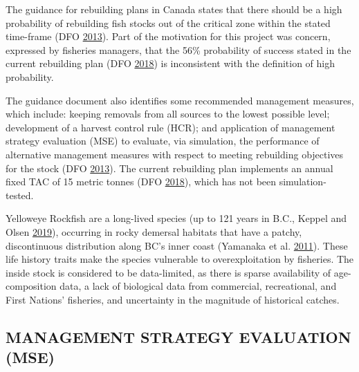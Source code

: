 \documentclass[11pt]{book}
\begin{document}
The guidance for rebuilding plans in Canada states that there should be a high probability of rebuilding fish stocks out of the critical zone within the stated time-frame (DFO \protect\hyperlink{ref-dfo2013}{2013}). Part of the motivation for this project was concern, expressed by fisheries managers, that the 56\% probability of success stated in the current rebuilding plan (DFO \protect\hyperlink{ref-ifmp2018}{2018}) is inconsistent with the definition of high probability.

The guidance document also identifies some recommended management measures, which include: keeping removals from all sources to the lowest possible level; development of a harvest control rule (HCR); and application of management strategy evaluation (MSE) to evaluate, via simulation, the performance of alternative management measures with respect to meeting rebuilding objectives for the stock (DFO \protect\hyperlink{ref-dfo2013}{2013}). The current rebuilding plan implements an annual fixed TAC of 15 metric tonnes (DFO \protect\hyperlink{ref-ifmp2018}{2018}), which has not been simulation-tested.

Yelloweye Rockfish are a long-lived species (up to 121 years in B.C., Keppel and Olsen \protect\hyperlink{ref-keppel2019}{2019}), occurring in rocky demersal habitats that have a patchy, discontinuous distribution along BC's inner coast (Yamanaka et al. \protect\hyperlink{ref-yamanaka2011}{2011}). These life history traits make the species vulnerable to overexploitation by fisheries. The inside stock is considered to be data-limited, as there is sparse availability of age-composition data, a lack of biological data from commercial, recreational, and First Nations' fisheries, and uncertainty in the magnitude of historical catches.

\hypertarget{sec:introduction-mse}{%
\subsection{MANAGEMENT STRATEGY EVALUATION (MSE)}\label{sec:introduction-mse}}
\end{document}
